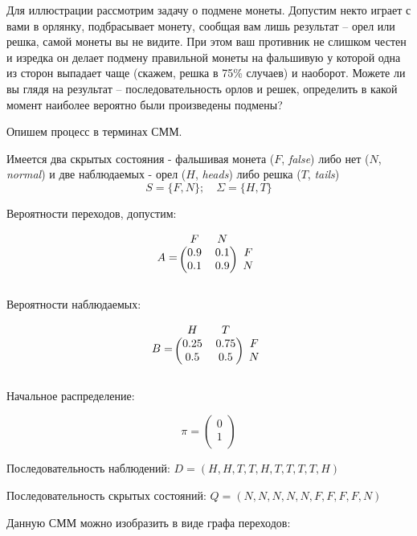 \documentclass[letterpaper, 11pt]{article}
\begin{document}
Для иллюстрации рассмотрим задачу о подмене монеты. Допустим некто играет с вами в орлянку, подбрасывает монету, сообщая вам лишь результат -- орел или решка, самой монеты вы не видите. При этом ваш противник не слишком честен и изредка он делает подмену правильной монеты на фальшивую у которой одна из сторон выпадает чаще (скажем, решка в 75\% случаев) и наоборот. Можете ли вы глядя на результат -- последовательность орлов и решек, определить в какой момент наиболее вероятно были произведены подмены?

Опишем  процесс в терминах СММ.

Имеется два скрытых состояния - фальшивая монета ($F$, \textit{false}) либо нет ($N$, \textit{normal}) и две наблюдаемых - орел ($H$, \textit{heads}) либо решка ($T$, \textit{tails})
$$S=\{F,N\};\quad \Sigma=\{H,T\}$$

Вероятности переходов, допустим:

$$A=
\begin{blockarray}{ccc}
F & N \\
\begin{block}{(cc)c}
0.9 & 0.1 & F \\
0.1 & 0.9 & N \\
\end{block}
\end{blockarray}
$$

Вероятности наблюдаемых:

$$B=
\begin{blockarray}{ccc}
H & T \\
\begin{block}{(cc)c}
0.25 & 0.75 & F \\
0.5 & 0.5 & N \\
\end{block}
\end{blockarray}
$$

Начальное распределение:

$$\pi=
\begin{pmatrix}
0 \\
1 \\
\end{pmatrix}
$$

  
Последовательность наблюдений:
$D=(H,H,T,T,H,T,T,T,T,H)$

Последовательность скрытых состояний:
$Q=(N,N,N,N,N,F,F,F,F,N)$

Данную СММ можно изобразить в виде графа переходов:
\end{document}
